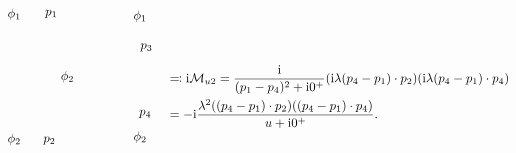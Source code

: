 \begin{equation}
\begin{gathered}
\begin{tikzpicture}[x=0.75pt,y=0.75pt,yscale=-1,xscale=1]
            \draw (154.97,104.34) node [anchor=south east] [inner sep=0.75pt]    {$\phi _{1}$};
            \draw (154.97,220.85) node [anchor=north east] [inner sep=0.75pt]    {$\phi _{2}$};
            \draw (177.98,102.05) node [anchor=south west] [inner sep=0.75pt]    {$p_{1}$};
            \draw (175.98,224.14) node [anchor=north west][inner sep=0.75pt]    {$p_{2}$};
            \draw (210.71,162.59) node [anchor=east] [inner sep=0.75pt]    {$\phi _{2}$};
            \draw (277.71,126.47) node [anchor=north west][inner sep=0.75pt]    {$p_{3}$};
            \draw (276.45,207.05) node [anchor=south west] [inner sep=0.75pt]    {$p_{4}$};
            \draw (270.45,106.34) node [anchor=south west] [inner sep=0.75pt]    {$\phi _{1}$};
            \draw (270.45,218.85) node [anchor=north west][inner sep=0.75pt]    {$\phi _{2}$};
            \end{tikzpicture}            
    \end{gathered} \quad \begin{aligned}[t]
        &\eqqcolon \ii \mathcal{M}_{u2} = \frac{\ii}{(p_1 - p_4)^2 + \ii 0^+} ( \ii \lambda (p_4 - p_1) \cdot p_2) ( \ii \lambda (p_4 - p_1) \cdot p_4) \\
        &= - \ii \frac{\lambda^2 ((p_4 - p_1) \cdot p_2)((p_4 - p_1) \cdot p_4)}{u + \ii 0^+ }.
   \end{aligned}
\end{equation}